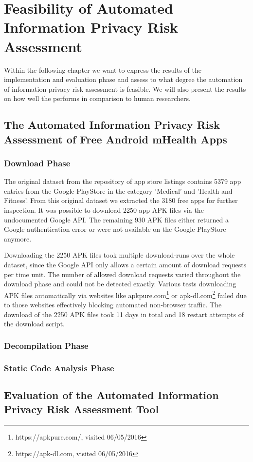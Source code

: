 \section{Feasibility of Automated Information Privacy Risk Assessment}

Within the following chapter we want to express the results of the implementation and evaluation phase and assess to what degree the automation of information privacy risk assessment is feasible.
We will also present the results on how well the \aiprat performs in comparison to human researchers.

\subsection{The Automated Information Privacy Risk Assessment of Free Android mHealth Apps}

\subsubsection{Download Phase}

The original dataset from the \cite{Xu2015} repository of app store listings contains 5379 app entries from the Google PlayStore in the category 'Medical' and 'Health and Fitness'.
From this original dataset we extracted the 3180 free apps for further inspection.
It was possible to download 2250 app APK files via the undocumented Google API.
The remaining 930 APK files either returned a Google authentication error or were not available on the Google PlayStore anymore.

Downloading the 2250 APK files took multiple download-runs over the whole dataset, since the Google API only allows a certain amount of download requests per time unit.
The number of allowed download requests varied throughout the download phase and could not be detected exactly.
Various tests downloading APK files automatically via websites like apkpure.com\footnote{https://apkpure.com/, visited 06/05/2016} or apk-dl.com\footnote{https://apk-dl.com, visited 06/05/2016} failed due to those websites effectively blocking automated non-browser traffic.
The download of the 2250 APK files took 11 days in total and 18 restart attempts of the download script.

\subsubsection{Decompilation Phase}



\subsubsection{Static Code Analysis Phase}


\subsection{Evaluation of the Automated Information Privacy Risk Assessment Tool}